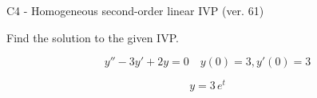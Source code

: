 \begin{exercise}
  \begin{exerciseTitle}C4 - Homogeneous second-order linear IVP (ver. 61)\end{exerciseTitle}
  \begin{exerciseStatement}
    
Find the solution to the given IVP.

    
\[y''-3y'+2y = 0 \hspace{1em} y(0) = 3 , y'(0) = 3\]

  \end{exerciseStatement}
  \begin{exerciseAnswer}
    
\[y= 3 \, e^{t}\]

  \end{exerciseAnswer}
\end{exercise}